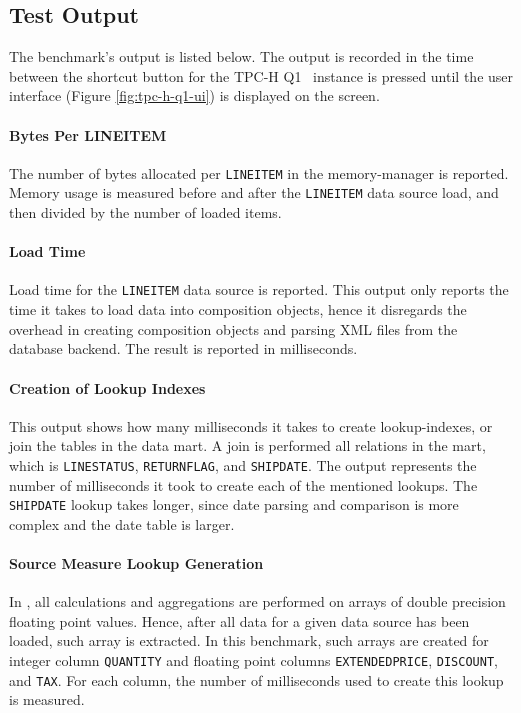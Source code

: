 \subsection{Test Output}
\label{sub:Test Output}
The benchmark's output is listed below. The output is recorded in the time between the shortcut button for the TPC-H Q1 \gd~instance is pressed until the user interface (Figure \ref{fig:tpc-h-q1-ui}) is displayed on the screen.

\paragraph{Bytes Per LINEITEM}
The number of bytes allocated per \texttt{LINEITEM} in the memory-manager is reported. Memory usage is measured before and after the \texttt{LINEITEM} data source load, and then divided by the number of loaded items.

\paragraph{Load Time}
\label{par:Load Time}
Load time for the \texttt{LINEITEM} data source is reported. This output only reports the time it takes to load data into composition objects, hence it disregards the overhead in creating composition objects and parsing XML files from the database backend. The result is reported in milliseconds.

\paragraph{Creation of Lookup Indexes}
This output shows how many milliseconds it takes to create lookup-indexes, or join the tables in the data mart. A join is performed all relations in the mart, which is \texttt{LINESTATUS}, \texttt{RETURNFLAG}, and \texttt{SHIPDATE}. The output represents the number of milliseconds it took to create each of the mentioned lookups. The \texttt{SHIPDATE} lookup takes longer, since date parsing and comparison is more complex and the date table is larger.

\paragraph{Source Measure Lookup Generation}
In \gd, all calculations and aggregations are performed on arrays of double precision floating point values. Hence, after all data for a given data source has been loaded, such array is extracted. In this benchmark, such arrays are created for integer column \texttt{QUANTITY} and floating point columns \texttt{EXTENDEDPRICE}, \texttt{DISCOUNT}, and \texttt{TAX}. For each column, the number of milliseconds used to create this lookup is measured.

